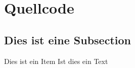 \documentclass[50pt, a4paper]{article}
\begin{document}
\section{Quellcode}


\begin{description}
\subsection{Dies ist eine Subsection}
\item{Dies ist ein Item} Ist dies ein Text
\end{description}
\end{document}
